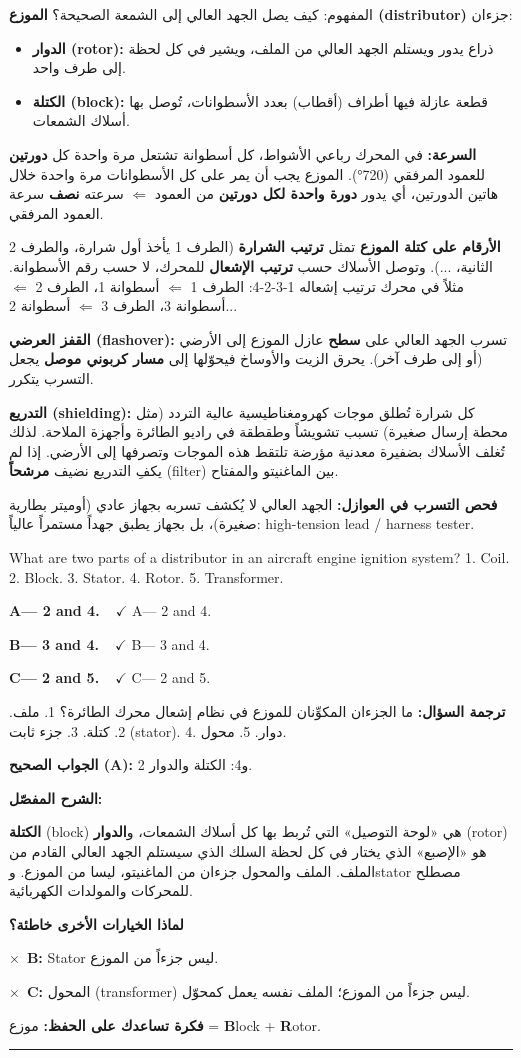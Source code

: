 \documentclass[11pt,a4paper]{article}
\newcommand{\en}[1]{\textenglish{#1}}
\newcommand{\correctletter}{}
\newcommand{\opt}[2]{%
  \ifdefstring{\correctletter}{#1}%
    {\textcolor{ansgreen}{\textbf{#1— #2\ \ $\checkmark$}}}%
    {#1— #2}\par}
\newcommand{\Q}[6]{%
  \renewcommand{\correctletter}{#6}%
  \par\bigskip
  \phantomsection\label{q#1}%
  \begin{tcolorbox}[enhanced,breakable,colback=qback,colframe=qframe,
      arc=2mm,boxrule=0.8pt,fonttitle=\bfseries,
      title={\en{Question #1}}]
    \begin{english}
      #2\par\smallskip
      \opt{A}{#3}\opt{B}{#4}\opt{C}{#5}
    \end{english}
  \end{tcolorbox}}
\newcommand{\tr}[1]{\textbf{\textcolor{qframe}{ترجمة السؤال:}} #1\par}
\newcommand{\ans}[2]{%
  \begin{tcolorbox}[colback=ansback,colframe=ansgreen,boxrule=0.6pt,arc=1.5mm,
      left=4pt,right=4pt,top=2pt,bottom=2pt]
    \textbf{\textcolor{ansgreen}{الجواب الصحيح (\en{#1}):}} #2
  \end{tcolorbox}}
\newcommand{\sharh}[1]{\textbf{\textcolor{conceptc}{الشرح المفصّل:}}\par #1\par}
\newcommand{\nohead}{\textbf{\textcolor{wrongc}{لماذا الخيارات الأخرى خاطئة؟}}\par}
\newcommand{\no}[2]{\hspace*{1em}\textcolor{wrongc}{$\times$}\ \textbf{\en{#1}:} #2\par}
\newcommand{\tip}[1]{%
  \begin{tcolorbox}[colback=tipback,colframe=tipframe,boxrule=0.5pt,arc=1.5mm,
      left=4pt,right=4pt,top=2pt,bottom=2pt]
    \textbf{فكرة تساعدك على الحفظ:} #1
  \end{tcolorbox}}
\newcommand{\qsep}{\par\medskip\noindent\textcolor{qframe!40}{\rule{\linewidth}{0.4pt}}\par}
\begin{document}
\begin{concept}{المفهوم: كيف يصل الجهد العالي إلى الشمعة الصحيحة؟}
\textbf{الموزع (\en{distributor})} جزءان:
\begin{itemize}
  \item \textbf{الدوار (\en{rotor}):} ذراع يدور ويستلم الجهد العالي من الملف، ويشير في كل لحظة إلى طرف واحد.
  \item \textbf{الكتلة (\en{block}):} قطعة عازلة فيها أطراف (أقطاب) بعدد الأسطوانات، تُوصل بها أسلاك الشمعات.
\end{itemize}
\textbf{السرعة:} في المحرك رباعي الأشواط، كل أسطوانة تشتعل مرة واحدة كل \textbf{دورتين} للعمود المرفقي (720°). الموزع يجب أن يمر على كل الأسطوانات مرة واحدة خلال هاتين الدورتين، أي يدور \textbf{دورة واحدة لكل دورتين} من العمود $\Leftarrow$ سرعته \textbf{نصف} سرعة العمود المرفقي.

\textbf{الأرقام على كتلة الموزع} تمثل \textbf{ترتيب الشرارة} (الطرف 1 يأخذ أول شرارة، والطرف 2 الثانية، ...). وتوصل الأسلاك حسب \textbf{ترتيب الإشعال} للمحرك، لا حسب رقم الأسطوانة. مثلاً في محرك ترتيب إشعاله 1-3-2-4: الطرف 1 $\Leftarrow$ أسطوانة 1، الطرف 2 $\Leftarrow$ أسطوانة 3، الطرف 3 $\Leftarrow$ أسطوانة 2...

\textbf{القفز العرضي (\en{flashover}):} تسرب الجهد العالي على \textbf{سطح} عازل الموزع إلى الأرضي (أو إلى طرف آخر). يحرق الزيت والأوساخ فيحوّلها إلى \textbf{مسار كربوني موصل} يجعل التسرب يتكرر.

\textbf{التدريع (\en{shielding}):} كل شرارة تُطلق موجات كهرومغناطيسية عالية التردد (مثل محطة إرسال صغيرة) تسبب تشويشاً وطقطقة في راديو الطائرة وأجهزة الملاحة. لذلك تُغلف الأسلاك بضفيرة معدنية مؤرضة تلتقط هذه الموجات وتصرفها إلى الأرضي. إذا لم يكفِ التدريع نضيف \textbf{مرشحاً} (\en{filter}) بين الماغنيتو والمفتاح.

\textbf{فحص التسرب في العوازل:} الجهد العالي لا يُكشف تسربه بجهاز عادي (أوميتر بطارية صغيرة)، بل بجهاز يطبق جهداً مستمراً عالياً: \en{high-tension lead / harness tester}.
\end{concept}

\Q{8603}{What are two parts of a distributor in an aircraft engine ignition system? 1. Coil. 2. Block. 3. Stator. 4. Rotor. 5. Transformer.}
{2 and 4.}
{3 and 4.}
{2 and 5.}{A}
\tr{ما الجزءان المكوِّنان للموزع في نظام إشعال محرك الطائرة؟ 1. ملف. 2. كتلة. 3. جزء ثابت (\en{stator}). 4. دوار. 5. محول.}
\ans{A}{2 و4: الكتلة والدوار.}
\sharh{\textbf{الكتلة} (\en{block}) هي «لوحة التوصيل» التي تُربط بها كل أسلاك الشمعات، و\textbf{الدوار} (\en{rotor}) هو «الإصبع» الذي يختار في كل لحظة السلك الذي سيستلم الجهد العالي القادم من الملف. الملف والمحول جزءان من الماغنيتو، ليسا من الموزع. و\en{stator} مصطلح للمحركات والمولدات الكهربائية.}
\nohead
\no{B}{\en{Stator} ليس جزءاً من الموزع.}
\no{C}{المحول (\en{transformer}) ليس جزءاً من الموزع؛ الملف نفسه يعمل كمحوّل.}
\tip{موزع = \en{\textbf{B}lock} + \en{\textbf{R}otor}.}
\qsep
\end{document}
